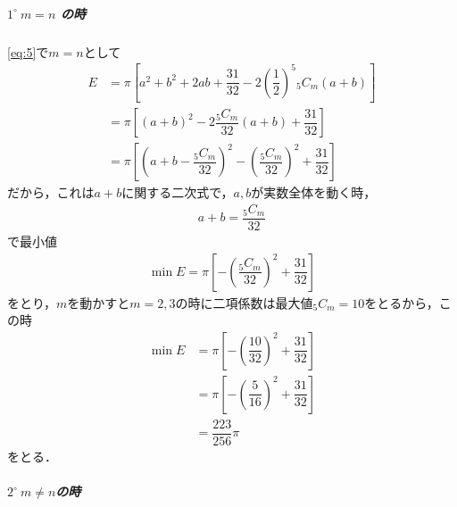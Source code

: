 \documentclass[../../main.tex]{subfiles}
\begin{document}
\subparagraph{$1^\circ \ m=n$ の時}

\cref{eq:5}で$m=n$として
\begin{align}
  E
  &= \pi\left[a^2+b^2+2ab+\dfrac{31}{32} - 2\left( \dfrac{1}{2} \right)^5 {}_5C_m(a+b) \right] \\
  &= \pi\left[(a+b)^2 - 2\dfrac{{}_5C_m}{32}(a+b) + \dfrac{31}{32} \right] \\
  &= \pi\left[\left(a+b-\dfrac{{}_5C_m}{32}\right)^2 - \left(\dfrac{{}_5C_m}{32}\right)^2 + \dfrac{31}{32}\right]
\end{align}
だから，これは$a+b$に関する二次式で，$a,b$が実数全体を動く時，
\begin{align}
  a + b = \dfrac{{}_5C_m}{32} \label{eq:6}
\end{align}
で最小値
\begin{align}
  \min E = \pi\left[- \left(\dfrac{{}_5C_m}{32}\right)^2 + \dfrac{31}{32} \right]
\end{align}
をとり，$m$を動かすと$m=2,3$の時に二項係数は最大値${}_5C_m=10$をとるから，この時
\begin{align}
  \min E
  & = \pi\left[- \left(\dfrac{10}{32}\right)^2 + \dfrac{31}{32} \right] \\
  & = \pi\left[- \left(\dfrac{5}{16}\right)^2 + \dfrac{31}{32} \right] \\
  & = \dfrac{223}{256}\pi \label{eq:7}
\end{align}
をとる．

\subparagraph{$2^\circ \ m \neq n$の時}
\end{document}
